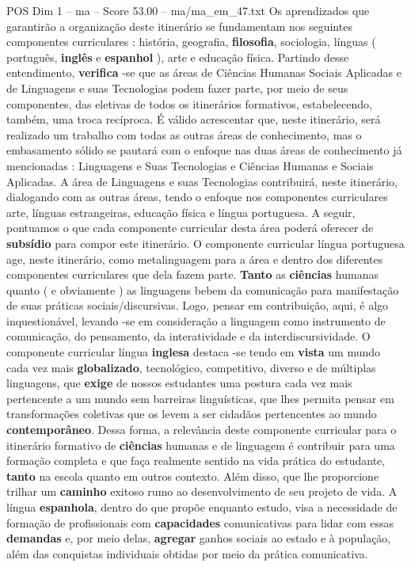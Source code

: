 \begin{textsample}{POS Dim 1 – ma – Score 53.00 – ma/ma\_em\_47.txt}
Os aprendizados que garantirão a organização deste itinerário se fundamentam nos seguintes componentes curriculares : história, geografia, \textbf{filosofia}, sociologia, línguas ( português, \textbf{inglês} e \textbf{espanhol} ), arte e educação física.
Partindo desse entendimento, \textbf{verifica} -se que as áreas de Ciências Humanas Sociais Aplicadas e de Linguagens e suas Tecnologias podem fazer parte, por meio de seus componentes, das eletivas de todos os itinerários formativos, estabelecendo, também, uma troca recíproca.
É válido acrescentar que, neste itinerário, será realizado um trabalho com todas as outras áreas de conhecimento, mas o embasamento sólido se pautará com o enfoque nas duas áreas de conhecimento já mencionadas : Linguagens e Suas Tecnologias e Ciências Humanas e Sociais Aplicadas.
A área de Linguagens e suas Tecnologias contribuirá, neste itinerário, dialogando com as outras áreas, tendo o enfoque nos componentes curriculares arte, línguas estrangeiras, educação física e língua portuguesa.
A seguir, pontuamos o que cada componente curricular desta área poderá oferecer de \textbf{subsídio} para compor este itinerário.
O componente curricular língua portuguesa age, neste itinerário, como metalinguagem para a área e dentro dos diferentes componentes curriculares que dela fazem parte. \textbf{Tanto} as \textbf{ciências} humanas quanto ( e obviamente ) as linguagens bebem da comunicação para manifestação de suas práticas sociais/discursivas.
Logo, pensar em contribuição, aqui, é algo inquestionável, levando -se em consideração a linguagem como instrumento de comunicação, do pensamento, da interatividade e da interdiscursividade.
O componente curricular língua \textbf{inglesa} destaca -se tendo em \textbf{vista} um mundo cada vez mais \textbf{globalizado}, tecnológico, competitivo, diverso e de múltiplas linguagens, que \textbf{exige} de nossos estudantes uma postura cada vez mais pertencente a um mundo sem barreiras linguísticas, que lhes permita pensar em transformações coletivas que os levem a ser cidadãos pertencentes ao mundo \textbf{contemporâneo}.
Dessa forma, a relevância deste componente curricular para o itinerário formativo de \textbf{ciências} humanas e de linguagem é contribuir para uma formação completa e que faça realmente sentido na vida prática do estudante, \textbf{tanto} na escola quanto em outros contexto.
Além disso, que lhe proporcione trilhar um \textbf{caminho} exitoso rumo ao desenvolvimento de seu projeto de vida.
A língua \textbf{espanhola}, dentro do que propõe enquanto estudo, visa a necessidade de formação de profissionais com \textbf{capacidades} comunicativas para lidar com essas \textbf{demandas} e, por meio delas, \textbf{agregar} ganhos sociais ao estado e à população, além das conquistas individuais obtidas por meio da prática comunicativa.

\end{textsample}
